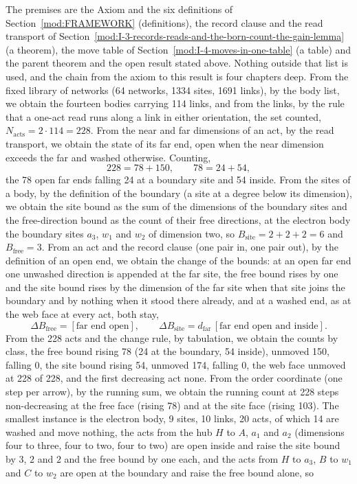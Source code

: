 \begin{chproof}[census]
The premises are the Axiom and the six definitions of Section~\ref{mod:FRAMEWORK} (definitions), the record clause and the read transport of Section~\ref{mod:I-3-records-reads-and-the-born-count-the-gain-lemma} (a theorem), the move table of Section~\ref{mod:I-4-moves-in-one-table} (a table) and the parent theorem and the open result stated above. Nothing outside that list is used, and the chain from the axiom to this result is four chapters deep.
From the fixed library of networks (64 networks, 1334 sites, 1691 links), by the body list, we obtain the fourteen bodies carrying 114 links, and from the links, by the rule that a one-act read runs along a link in either orientation, the set counted, $N_{\mathrm{acts}} = 2 \cdot 114 = 228$. From the near and far dimensions of an act, by the read transport, we obtain the state of its far end, open when the near dimension exceeds the far and washed otherwise. Counting,
\begin{equation}
228 = 78 + 150, \qquad 78 = 24 + 54 ,
\end{equation}
the 78 open far ends falling 24 at a boundary site and 54 inside. From the sites of a body, by the definition of the boundary (a site at a degree below its dimension), we obtain the site bound as the sum of the dimensions of the boundary sites and the free-direction bound as the count of their free directions, at the electron body the boundary sites $a_3$, $w_1$ and $w_2$ of dimension two, so $B_{\mathrm{site}} = 2 + 2 + 2 = 6$ and $B_{\mathrm{free}} = 3$. From an act and the record clause (one pair in, one pair out), by the definition of an open end, we obtain the change of the bounds: at an open far end one unwashed direction is appended at the far site, the free bound rises by one and the site bound rises by the dimension of the far site when that site joins the boundary and by nothing when it stood there already, and at a washed end, as at the web face at every act, both stay,
\begin{equation}
\Delta B_{\mathrm{free}} = [\text{far end open}], \qquad \Delta B_{\mathrm{site}} = d_{\mathrm{far}} \, [\text{far end open and inside}] .
\end{equation}
From the 228 acts and the change rule, by tabulation, we obtain the counts by class, the free bound rising 78 (24 at the boundary, 54 inside), unmoved 150, falling 0, the site bound rising 54, unmoved 174, falling 0, the web face unmoved at 228 of 228, and the first decreasing act none. From the order coordinate (one step per arrow), by the running sum, we obtain the running count at 228 steps non-decreasing at the free face (rising 78) and at the site face (rising 103). The smallest instance is the electron body, 9 sites, 10 links, 20 acts, of which 14 are washed and move nothing, the acts from the hub $H$ to $A$, $a_1$ and $a_2$ (dimensions four to three, four to two, four to two) are open inside and raise the site bound by $3$, $2$ and $2$ and the free bound by one each, and the acts from $H$ to $a_3$, $B$ to $w_1$ and $C$ to $w_2$ are open at the boundary and raise the free bound alone, so

\end{chproof}
